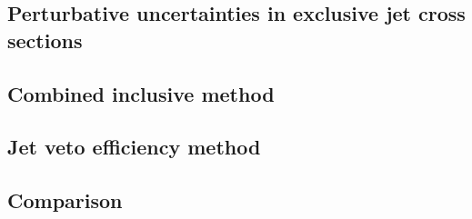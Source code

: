 
\subsection{Perturbative uncertainties in exclusive jet cross sections}
\subsection{Combined inclusive method}
\subsection{Jet veto efficiency method}
\subsection{Comparison}
